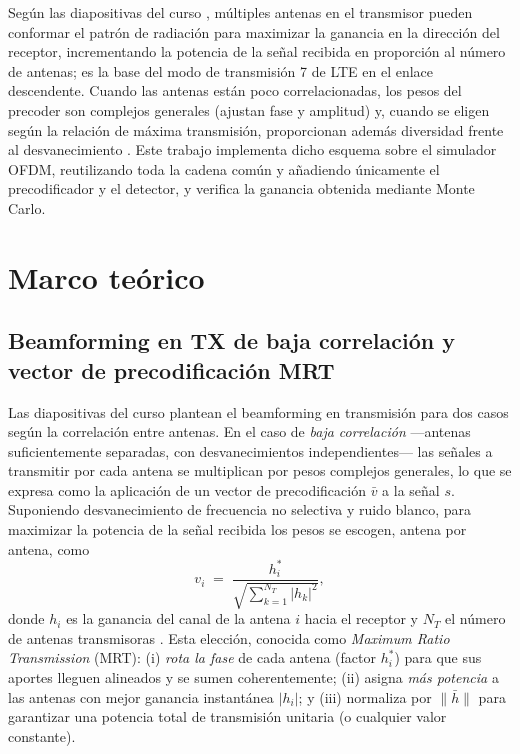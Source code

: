 \documentclass[conference,onecolumn]{IEEEtran}
\begin{document}
Seg\'un las diapositivas del curso \cite{vazquez_cmoviles}, m\'ultiples antenas en el transmisor pueden conformar el patr\'on de radiaci\'on para maximizar la ganancia en la direcci\'on del receptor, incrementando la potencia de la se\~nal recibida en proporci\'on al n\'umero de antenas; es la base del modo de transmisi\'on 7 de LTE en el enlace descendente. Cuando las antenas est\'an poco correlacionadas, los pesos del precoder son complejos generales (ajustan fase y amplitud) y, cuando se eligen seg\'un la relaci\'on de m\'axima transmisi\'on, proporcionan adem\'as diversidad frente al desvanecimiento \cite{vazquez_cmoviles,lo1999mrt}. Este trabajo implementa dicho esquema sobre el simulador OFDM, reutilizando toda la cadena com\'un y a\~nadiendo \'unicamente el precodificador y el detector, y verifica la ganancia obtenida mediante Monte Carlo.

\section{Marco te\'orico}

\subsection{Beamforming en TX de baja correlaci\'on y vector de precodificaci\'on MRT}

Las diapositivas del curso \cite{vazquez_cmoviles} plantean el beamforming en transmisi\'on para dos casos seg\'un la correlaci\'on entre antenas. En el caso de \emph{baja correlaci\'on} ---antenas suficientemente separadas, con desvanecimientos independientes--- las se\~nales a transmitir por cada antena se multiplican por pesos complejos generales, lo que se expresa como la aplicaci\'on de un vector de precodificaci\'on $\bar{v}$ a la se\~nal $s$. Suponiendo desvanecimiento de frecuencia no selectiva y ruido blanco, para maximizar la potencia de la se\~nal recibida los pesos se escogen, antena por antena, como
\begin{equation}
v_i \;=\; \frac{h_i^{*}}{\sqrt{\sum_{k=1}^{N_T}\lvert h_k\rvert^{2}}},
\label{eq:precoder}
\end{equation}
donde $h_i$ es la ganancia del canal de la antena $i$ hacia el receptor y $N_T$ el n\'umero de antenas transmisoras \cite{vazquez_cmoviles,lo1999mrt}. Esta elecci\'on, conocida como \textit{Maximum Ratio Transmission} (MRT): (i) \emph{rota la fase} de cada antena (factor $h_i^{*}$) para que sus aportes lleguen alineados y se sumen coherentemente; (ii) asigna \emph{m\'as potencia} a las antenas con mejor ganancia instant\'anea $\lvert h_i\rvert$; y (iii) normaliza por $\|\bar h\|$ para garantizar una potencia total de transmisi\'on unitaria (o cualquier valor constante).
\end{document}
